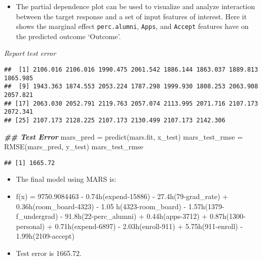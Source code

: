 \documentclass[
]{article}
\newenvironment{Shaded}{\begin{snugshade}}{\end{snugshade}}
\newcommand{\AttributeTok}[1]{\textcolor[rgb]{0.77,0.63,0.00}{#1}}
\newcommand{\DecValTok}[1]{\textcolor[rgb]{0.00,0.00,0.81}{#1}}
\newcommand{\DocumentationTok}[1]{\textcolor[rgb]{0.56,0.35,0.01}{\textbf{\textit{#1}}}}
\newcommand{\FunctionTok}[1]{\textcolor[rgb]{0.00,0.00,0.00}{#1}}
\newcommand{\NormalTok}[1]{#1}
\newcommand{\OtherTok}[1]{\textcolor[rgb]{0.56,0.35,0.01}{#1}}
\newcommand{\SpecialCharTok}[1]{\textcolor[rgb]{0.00,0.00,0.00}{#1}}
\newcommand{\StringTok}[1]{\textcolor[rgb]{0.31,0.60,0.02}{#1}}
\providecommand{\tightlist}{%
  \setlength{\itemsep}{0pt}\setlength{\parskip}{0pt}}
\begin{document}
\begin{itemize}
\tightlist
\item
  The partial dependence plot can be used to visualize and analyze
  interaction between the target response and a set of input features of
  interest. Here it shows the marginal effect \texttt{perc.alumni},
  \texttt{Apps}, and \texttt{Accept} features have on the predicted
  outcome `Outcome'.
\end{itemize}

\emph{Report test error}

\begin{Shaded}
\end{Shaded}

\begin{verbatim}
##  [1] 2106.016 2106.016 1990.475 2061.542 1886.144 1863.037 1889.813 1865.985
##  [9] 1943.363 1874.553 2053.224 1787.298 1999.930 1808.253 2063.908 2057.821
## [17] 2063.030 2052.791 2119.763 2057.074 2113.995 2071.716 2107.173 2072.341
## [25] 2107.173 2128.225 2107.173 2130.499 2107.173 2142.306
\end{verbatim}

\begin{Shaded}
\begin{Highlighting}[]
\DocumentationTok{\#\# Test Error}
\NormalTok{mars\_pred }\OtherTok{=} \FunctionTok{predict}\NormalTok{(mars.fit, x\_test)}
\NormalTok{mars\_test\_rmse }\OtherTok{=} \FunctionTok{RMSE}\NormalTok{(mars\_pred, y\_test)}
\NormalTok{mars\_test\_rmse}
\end{Highlighting}
\end{Shaded}

\begin{verbatim}
## [1] 1665.72
\end{verbatim}

\begin{itemize}
\item
  The final model using MARS is:
\item
  f(x) = 9750.9084463 - 0.74h(expend-15886) - 27.4h(79-grad\_rate) +
  0.36h(room\_board-4323) - 1.05 h(4323-room\_board) -
  1.57h(1379-f\_undergrad) - 91.8h(22-perc\_alumni) + 0.44h(apps-3712) +
  0.87h(1300-personal) + 0.71h(expend-6897) - 2.03h(enroll-911) +
  5.75h(911-enroll) - 1.99h(2109-accept)
\item
  Test error is 1665.72.
\end{itemize}
\end{document}
